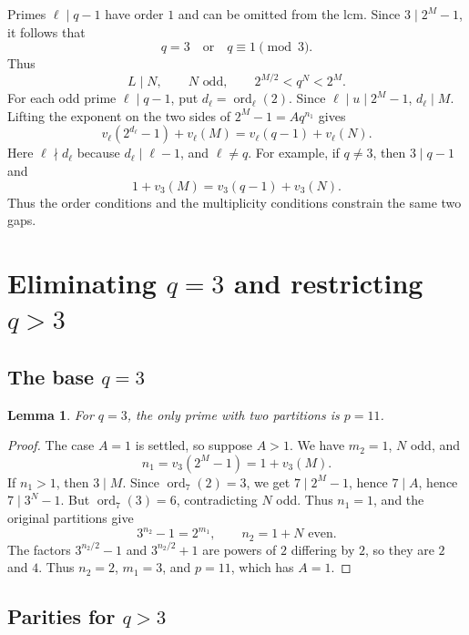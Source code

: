\documentclass[11pt]{article}
\newtheorem{lemma}{Lemma}
\begin{document}
Primes $\ell\mid q-1$ have order $1$ and can be omitted from the lcm.
Since $3\mid2^M-1$, it follows that
\[
q=3\quad\text{or}\quad q\equiv1\pmod3.
\]
Thus
\[
L\mid N,\qquad N\text{ odd},\qquad
2^{M/2}<q^N<2^M.
\]
For each odd prime $\ell\mid q-1$, put
$d_\ell=\operatorname{ord}_\ell(2)$. Since $\ell\mid u\mid2^M-1$,
$d_\ell\mid M$. Lifting the exponent on the two sides of
$2^M-1=Aq^{n_1}$ gives
\begin{equation}\label{eq:valuation-coupling}
\boxed{
v_\ell(2^{d_\ell}-1)+v_\ell(M)
 =v_\ell(q-1)+v_\ell(N).}
\end{equation}
Here $\ell\nmid d_\ell$ because $d_\ell\mid\ell-1$, and $\ell\neq q$.
For example, if $q\neq3$, then $3\mid q-1$ and
\[
1+v_3(M)=v_3(q-1)+v_3(N).
\]
Thus the order conditions and the multiplicity conditions constrain
the same two gaps.

\section{\texorpdfstring{Eliminating $q=3$ and restricting $q>3$}{Eliminating q=3 and restricting q>3}}
\label{sec:parities}

\subsection{\texorpdfstring{The base $q=3$}{The base q=3}}

\begin{lemma}\label{lem:qthree}
For $q=3$, the only prime with two partitions is $p=11$.
\end{lemma}
\begin{proof}
The case $A=1$ is settled, so suppose $A>1$.
We have $m_2=1$, $N$ odd, and
\[
n_1=v_3(2^M-1)=1+v_3(M).
\]
If $n_1>1$, then $3\mid M$. Since $\operatorname{ord}_7(2)=3$,
we get $7\mid2^M-1$, hence $7\mid A$, hence $7\mid3^N-1$.
But $\operatorname{ord}_7(3)=6$, contradicting $N$ odd.
Thus $n_1=1$, and the original partitions give
\[
3^{n_2}-1=2^{m_1},\qquad n_2=1+N\text{ even}.
\]
The factors $3^{n_2/2}-1$ and $3^{n_2/2}+1$ are powers of $2$
differing by $2$, so they are $2$ and $4$. Thus $n_2=2$, $m_1=3$,
and $p=11$, which has $A=1$.
\end{proof}

\subsection{\texorpdfstring{Parities for $q>3$}{Parities for q>3}}
\end{document}
